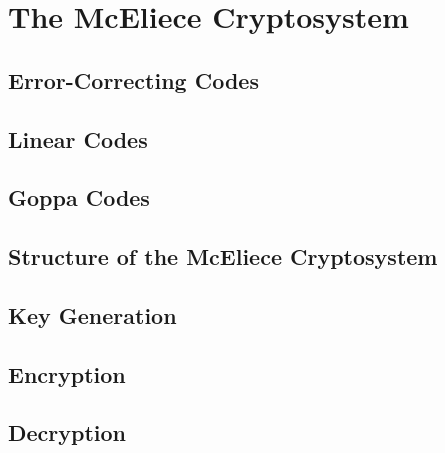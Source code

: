 \section{The McEliece Cryptosystem}
\label{chap:mceliece}

\subsection{Error-Correcting Codes}
\label{sec:errorCorrectingCodes}

\subsection{Linear Codes}
\label{sec:linearCodes}

\subsection{Goppa Codes}
\label{sec:goppaCodes}

\subsection{Structure of the McEliece Cryptosystem}
\label{sec:mcelieceStructure}

\subsection{Key Generation}
\label{sec:keyGeneration}

\subsection{Encryption}
\label{sec:mcelieceEncryption}

\subsection{Decryption}
\label{sec:mcelieceDecryption}

